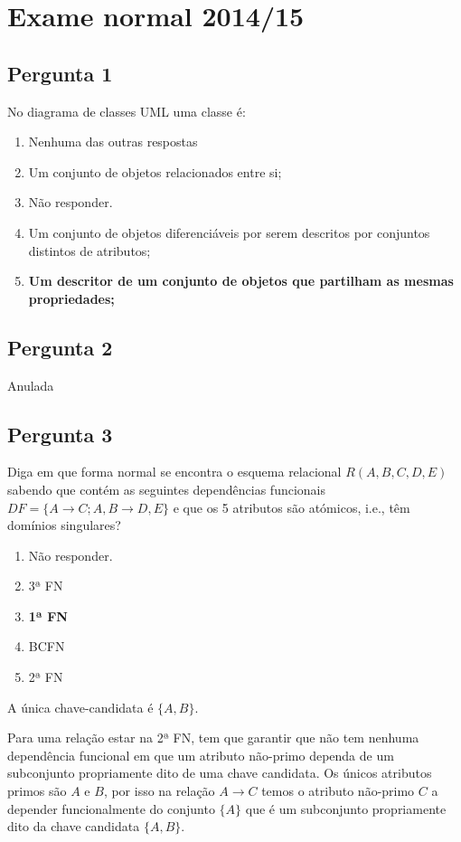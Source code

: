 \documentclass[type=normal, year=2014/15]{bdad_exam}
\begin{document}
{
\renewcommand{\thechapter}{\arabic{chapter}N}
\setcounter{chapter}{14}
\chapter{Exame normal 2014/15}

\section{Pergunta 1} 
No diagrama de classes UML uma classe é:
\begin{enumerate}[label=\alph*.]\itemsep0em
    \item Nenhuma das outras respostas
    \item Um conjunto de objetos relacionados entre si;
    \item Não responder.
    \item Um conjunto de objetos diferenciáveis por serem descritos por conjuntos distintos de atributos;
    \item \textbf{Um descritor de um conjunto de objetos que partilham as mesmas propriedades; \greencheckmark}
\end{enumerate}

\section{Pergunta 2}
Anulada

\section{Pergunta 3}
Diga em que forma normal se encontra o esquema relacional $R(A,B,C,D,E)$ sabendo que contém as seguintes dependências funcionais $DF=\{A \rightarrow C; A,B \rightarrow D,E\}$ e que os 5 atributos são atómicos, i.e., têm domínios singulares?
\begin{enumerate}[label=\alph*.]\itemsep0em
    \item Não responder.
    \item 3ª FN
    \item \textbf{1ª FN \greencheckmark}
    \item BCFN
    \item 2ª FN
\end{enumerate}
A única chave-candidata é $\{A,B\}$.

Para uma relação estar na 2ª FN, tem que garantir que não tem nenhuma dependência funcional em que um atributo não-primo dependa de um subconjunto propriamente dito de uma chave candidata. Os únicos atributos primos são $A$ e $B$, por isso na relação $A \rightarrow C$ temos o atributo não-primo $C$ a depender funcionalmente do conjunto $\{A\}$ que é um subconjunto propriamente dito da chave candidata $\{A,B\}$.

}
\end{document}
